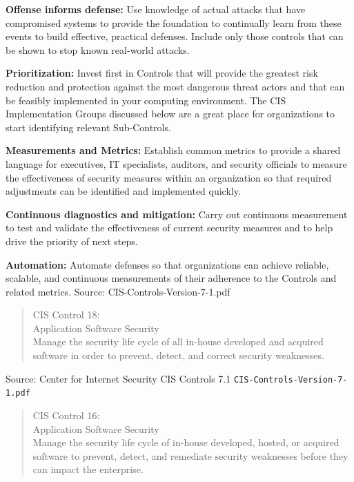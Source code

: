 \documentclass[Screen16to9,17pt]{foils}
\begin{document}
\begin{list2}
\item {\bf Offense informs defense:} Use knowledge of actual attacks that have
compromised systems to provide the foundation to continually learn
from these events to build effective, practical defenses. Include only
those controls that can be shown to stop known real-world attacks.
\item {\bf Prioritization:} Invest first in Controls that will provide the greatest risk
reduction and protection against the most dangerous threat actors
and that can be feasibly implemented in your computing environment.
The CIS Implementation Groups discussed below are a great place for
organizations to start identifying relevant Sub-Controls.
\item {\bf Measurements and Metrics:} Establish common metrics to provide a
shared language for executives, IT specialists, auditors, and security
officials to measure the effectiveness of security measures within
an organization so that required adjustments can be identified and
implemented quickly.
\item {\bf Continuous diagnostics and mitigation:} Carry out continuous
measurement to test and validate the effectiveness of current security
measures and to help drive the priority of next steps.
\item {\bf Automation:} Automate defenses so that organizations can achieve
reliable, scalable, and continuous measurements of their adherence to
the Controls and related metrics. \hfill {\footnotesize Source: CIS-Controls-Version-7-1.pdf}
\end{list2}



\begin{quote}
CIS Control 18:\\
Application Software Security\\
Manage the security life cycle of all in-house developed and acquired software in order to prevent, detect, and correct security weaknesses.
\end{quote}

Source: Center for Internet Security CIS Controls 7.1 \verb+CIS-Controls-Version-7-1.pdf+

\begin{quote}
CIS Control 16:\\
Application Software Security\\
Manage the security life cycle of in-house developed, hosted,
or acquired software to prevent, detect, and remediate security
weaknesses before they can impact the enterprise.
\end{quote}
\end{document}
